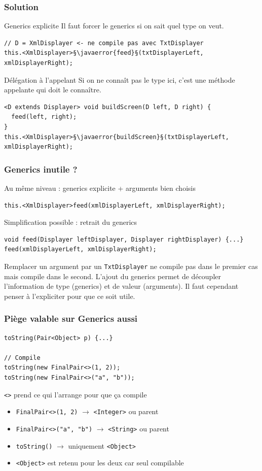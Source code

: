 \documentclass[draft]{beamer}
\makeatletter
\def\uwave{\bgroup\markoverwith{\lower4\p@\hbox{\sixly \textcolor{errorcolor}{\char58}}}\ULon}
\newcommand{\javaerror}[1]{%
  \uwave{#1}%
}
\DeclareRobustCommand{\todo}[1]{\ifdraft{\textbf{\textcolor{red}{[#1]}}}{}}
\makeatother
\begin{document}
\begin{frame}[fragile]
\frametitle{Solution}
\begin{exampleblock}{Generics explicite}
 Il faut forcer le generics si on sait quel type on veut.
\end{exampleblock}
\begin{lstlisting}
// D = XmlDisplayer <- ne compile pas avec TxtDisplayer
this.<XmlDisplayer>§\javaerror{feed}§(txtDisplayerLeft, xmlDisplayerRight);
\end{lstlisting}
\begin{exampleblock}{Délégation à l'appelant}
 Si on ne connaît pas le type ici, c'est une méthode appelante qui doit le connaître.
\end{exampleblock}
\begin{lstlisting}
<D extends Displayer> void buildScreen(D left, D right) {
  feed(left, right);
}
this.<XmlDisplayer>§\javaerror{buildScreen}§(txtDisplayerLeft, xmlDisplayerRight);
\end{lstlisting}
\end{frame}

\begin{frame}[fragile]
\frametitle{Generics inutile ?}
Au même niveau : generics explicite + arguments bien choisis
\begin{lstlisting}
this.<XmlDisplayer>feed(xmlDisplayerLeft, xmlDisplayerRight);
\end{lstlisting}
Simplification possible : retrait du generics
\begin{lstlisting}
void feed(Displayer leftDisplayer, Displayer rightDisplayer) {...}
feed(xmlDisplayerLeft, xmlDisplayerRight);
\end{lstlisting}
Remplacer un argument par un \lstinline{TxtDisplayer} ne compile pas dans le premier cas mais compile dans le second.
L'ajout du generics permet de découpler l'information de type (generics) et de valeur (arguments).
Il faut cependant penser à l'expliciter pour que ce soit utile.
\end{frame}

\begin{frame}[fragile]
\frametitle{Piège valable sur Generics aussi}
\todo{Même section ou nouvelle ?}
\begin{lstlisting}
toString(Pair<Object> p) {...}

// Compile
toString(new FinalPair<>(1, 2));
toString(new FinalPair<>("a", "b"));
\end{lstlisting}
\begin{alertblock}{\lstinline{<>} prend ce qui l'arrange pour que ça compile}
 \begin{itemize}
  \item \lstinline{FinalPair<>(1, 2)} $\rightarrow$ \lstinline{<Integer>} ou parent
  \item \lstinline{FinalPair<>("a", "b")} $\rightarrow$ \lstinline{<String>} ou parent
  \item \lstinline{toString()} $\rightarrow$ uniquement \lstinline{<Object>}
  \item \lstinline{<Object>} est retenu pour les deux car seul compilable
 \end{itemize}
\end{alertblock}
\end{frame}
\end{document}
